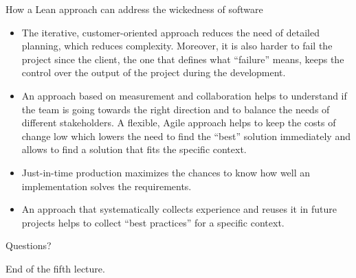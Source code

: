 \documentclass{beamer}
\begin{document}
\begin{frame}{\small \centerline{How a Lean approach can address the wickedness of software}}
\small
\begin{itemize}
\item The iterative, customer-oriented approach reduces the need of detailed planning, which reduces complexity. Moreover, it is also harder to fail the project since the client, the one that defines what ``failure'' means, keeps the control over the output of the project during the development.
\item An approach based on measurement and collaboration helps to understand if the team is going towards the right direction and to balance the needs of different stakeholders.
A flexible, Agile approach helps to keep the costs of change low which lowers the need to find the ``best'' solution immediately and allows to find a solution that fits the specific context.
\item Just-in-time production maximizes the chances to know how well an implementation solves the requirements.
\item An approach that systematically collects experience and reuses it in future projects helps to collect ``best practices'' for a specific context.
\end{itemize}

\end{frame}


\begin{frame}
{\centerline{Questions?}}
\vspace{1cm}
\begin{center}
    \LARGE{End of the fifth lecture.}
\end{center}

\end{frame}
\end{document}
